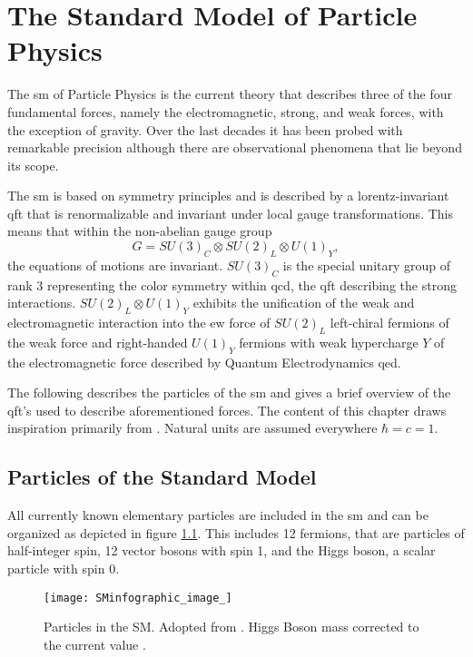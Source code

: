 \chapter{The Standard Model of Particle Physics}
\noindent The \ac{sm} of Particle Physics is the current theory that describes three of the four fundamental forces, namely the electromagnetic, strong, and weak forces, with the exception of gravity. Over the last decades it has been probed with remarkable precision although there are  observational phenomena that lie beyond its scope.

The \ac{sm} is based on symmetry principles and is described by a lorentz-invariant \ac{qft} that is renormalizable and invariant under local gauge transformations. This means that within the non-abelian gauge group
\begin{equation}
    G = SU(3)_C \otimes SU(2)_L \otimes U(1)_Y,
\end{equation}
the equations of motions are invariant. $SU(3)_C$ is the special unitary group of rank 3 representing the color symmetry within \ac{qcd}, the \ac{qft} describing the strong interactions. $SU(2)_L \otimes U(1)_Y$ exhibits the unification of the weak and electromagnetic interaction into the \ac{ew} force of $SU(2)_L$ left-chiral fermions of the weak force and right-handed $U(1)_Y$ fermions with weak hypercharge $Y$ of the electromagnetic force described by Quantum Electrodynamics \ac{qed}.

The following describes the particles of the \ac{sm} and gives a brief overview of the \ac{qft}'s used to describe aforementioned forces. The content of this chapter draws inspiration primarily from \citep{hollik2010quantum,griffiths2020introduction,thomson2013modern,zee2010quantum,halzen1984introductory}. Natural units are assumed everywhere $\hbar=c=1$.


\section{Particles of the Standard Model}

All currently known elementary particles are included in the \ac{sm} and can be organized as depicted in figure \ref{fig:sm}. This includes 12 fermions, that are particles of half-integer spin, 12 vector bosons with spin 1, and the Higgs boson, a scalar particle with spin 0.


\begin{figure}
    \centering
    \texttt{[image: SMinfographic\_image\_]}
    \caption[]{Particles in the SM. Adopted from \citep{smpar}. Higgs Boson mass corrected to the current value \citep{particle2022review}. }
    \label{fig:sm}
\end{figure}


